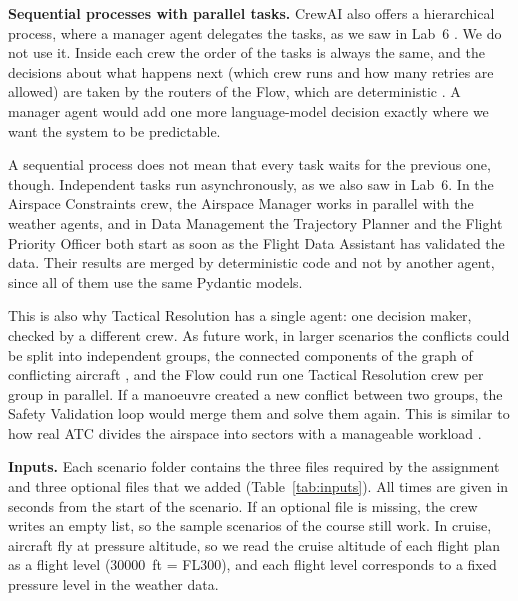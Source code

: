 \textbf{Sequential processes with parallel tasks.} CrewAI also offers a hierarchical process,
where a manager agent delegates the tasks, as we saw in Lab~6 \cite{crewai_docs}. We do not use
it. Inside each crew the order of the tasks is always the same, and the decisions about what
happens next (which crew runs and how many retries are allowed) are taken by the routers of the
Flow, which are deterministic \cite{crewai_flows}. A manager agent would add one more
language-model decision exactly where we want the system to be predictable.

A sequential process does not mean that every task waits for the previous one, though.
Independent tasks run asynchronously, as we also saw in Lab~6. In the Airspace Constraints
crew, the Airspace Manager works in parallel with the weather agents, and in Data Management
the Trajectory Planner and the Flight Priority Officer both start as soon as the Flight Data
Assistant has validated the data. Their results are merged by deterministic code and not by
another agent, since all of them use the same Pydantic models.

This is also why Tactical Resolution has a single agent: one decision maker, checked by a
different crew. As future work, in larger scenarios the conflicts could be split into
independent groups, the connected components of the graph of conflicting aircraft
\cite{durand1995optimal, stollenwerk2017quantum}, and the Flow could run one Tactical Resolution
crew per group in parallel. If a manoeuvre created a new conflict between two groups, the
Safety Validation loop would merge them and solve them again. This
is similar to how real ATC divides the airspace into sectors with a manageable workload
\cite{skybrary_sectorisation}.

\textbf{Inputs.} Each scenario folder contains the three files required by the assignment and
three optional files that we added (Table~\ref{tab:inputs}). All times are given in seconds
from the start of the scenario. If an optional file is missing, the crew writes an empty list,
so the sample scenarios of the course still work. In cruise, aircraft fly at pressure altitude,
so we read the cruise altitude of each flight plan as a flight level (30000~ft = FL300), and
each flight level corresponds to a fixed pressure level in the weather data.

